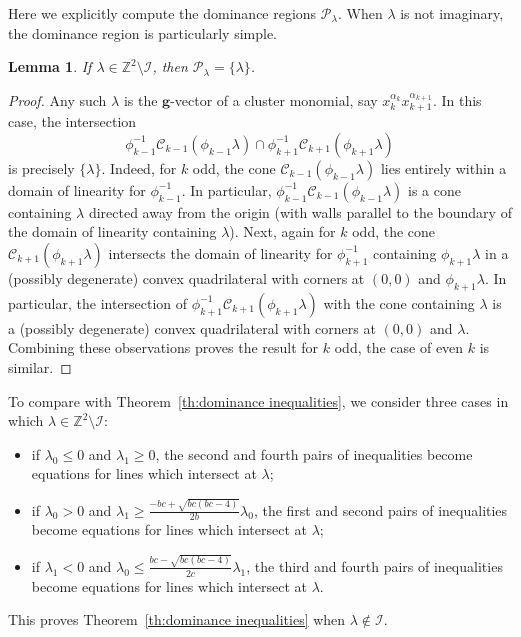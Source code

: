 \documentclass{amsart}
\newtheorem{lemma}[theorem]{Lemma}
\numberwithin{theorem}{section}
\newcommand{\bfg}{\boldsymbol{g}}
\newcommand{\cC}{\mathcal{C}}
\newcommand{\cI}{\mathcal{I}}
\newcommand{\cP}{\mathcal{P}}
\newcommand{\ZZ}{\mathbb{Z}}
\begin{document}
  Here we explicitly compute the dominance regions $\cP_\lambda$.
  When $\lambda$ is not imaginary, the dominance region is particularly simple.
  \begin{lemma}
    \label{le:cluster monomials}
    If $\lambda\in\ZZ^2\setminus\cI$, then $\cP_\lambda=\{\lambda\}$.
  \end{lemma}
  \begin{proof}
    Any such $\lambda$ is the $\bfg$-vector of a cluster monomial, say $x_k^{\alpha_k}x_{k+1}^{\alpha_{k+1}}$.
    In this case, the intersection
    \[\phi_{k-1}^{-1}\cC_{k-1}(\phi_{k-1}\lambda) \cap \phi_{k+1}^{-1}\cC_{k+1}(\phi_{k+1}\lambda)\]
    is precisely $\{\lambda\}$. 
    Indeed, for $k$ odd, the cone $\cC_{k-1}(\phi_{k-1}\lambda)$ lies entirely within a domain of linearity for $\phi_{k-1}^{-1}$.
    In particular, $\phi_{k-1}^{-1}\cC_{k-1}(\phi_{k-1}\lambda)$ is a cone containing $\lambda$ directed away from the origin (with walls parallel to the boundary of the domain of linearity containing $\lambda$).
    Next, again for $k$ odd, the cone $\cC_{k+1}(\phi_{k+1}\lambda)$ intersects the domain of linearity for $\phi_{k+1}^{-1}$ containing $\phi_{k+1}\lambda$ in a (possibly degenerate) convex quadrilateral with corners at $(0,0)$ and $\phi_{k+1}\lambda$.
    In particular, the intersection of $\phi_{k+1}^{-1}\cC_{k+1}(\phi_{k+1}\lambda)$ with the cone containing $\lambda$ is a (possibly degenerate) convex quadrilateral with corners at $(0,0)$ and $\lambda$.
    Combining these observations proves the result for $k$ odd, the case of even $k$ is similar.
  \end{proof}
  To compare with Theorem~\ref{th:dominance inequalities}, we consider three cases in which $\lambda\in\ZZ^2\setminus\cI$:
  \begin{itemize}
    \item if $\lambda_0 \le 0$ and $\lambda_1 \ge 0$, the second and fourth pairs of inequalities become equations for lines which intersect at $\lambda$;
    \item if $\lambda_0 > 0$ and $\lambda_1 \ge \frac{-bc+\sqrt{bc(bc-4)}}{2b}\lambda_0$, the first and second pairs of inequalities become equations for lines which intersect at $\lambda$;
    \item if $\lambda_1 < 0$ and $\lambda_0 \le \frac{bc-\sqrt{bc(bc-4)}}{2c}\lambda_1$, the third and fourth pairs of inequalities become equations for lines which intersect at $\lambda$.
  \end{itemize}
  This proves Theorem~\ref{th:dominance inequalities} when $\lambda\notin\cI$.
\end{document}
